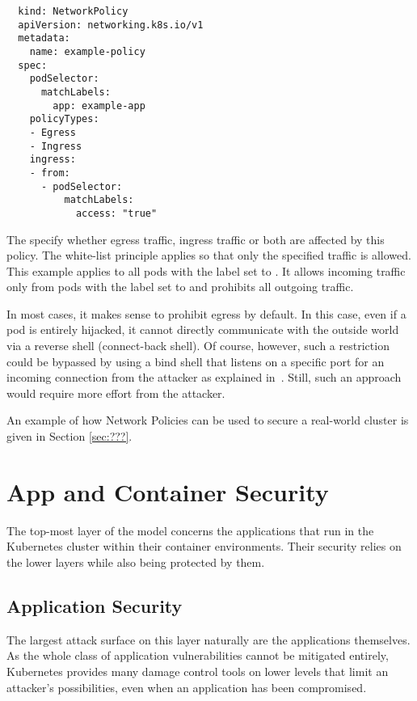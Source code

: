 \begin{verbatim}
  kind: NetworkPolicy
  apiVersion: networking.k8s.io/v1
  metadata:
    name: example-policy
  spec:
    podSelector:
      matchLabels:
        app: example-app
    policyTypes:
    - Egress
    - Ingress
    ingress:
    - from:
      - podSelector:
          matchLabels:
            access: "true"
\end{verbatim}

The  specify whether egress traffic, ingress traffic or both are affected by this policy. The white-list principle applies so that only the specified traffic is allowed. This example applies to all pods with the label  set to . It allows incoming traffic only from pods with the label  set to  and prohibits all outgoing traffic.

In most cases, it makes sense to prohibit egress by default. In this case, even if a pod is entirely hijacked, it cannot directly communicate with the outside world via a reverse shell (connect-back shell). Of course, however, such a restriction could be bypassed by using a bind shell that listens on a specific port for an incoming connection from the attacker as explained in~\textcite{bindAndReverseShells}. Still, such an approach would require more effort from the attacker.

An example of how Network Policies can be used to secure a real-world cluster is given in Section \ref{sec:???}. %

\section{App and Container Security} \label{sec:layer4}

The top-most layer of the model concerns the applications that run in the Kubernetes cluster within their container environments. Their security relies on the lower layers while also being protected by them.

\subsection{Application Security}

The largest attack surface on this layer naturally are the applications themselves. As the whole class of application vulnerabilities cannot be mitigated entirely, Kubernetes provides many damage control tools on lower levels that limit an attacker's possibilities, even when an application has been compromised.

